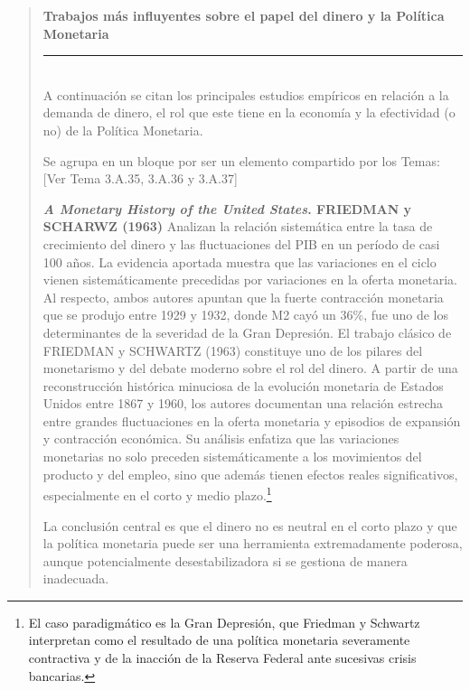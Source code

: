 \documentclass[10pt,a4paper]{article}
\newenvironment{specialblock}[1]{%
      \begin{quote} %
      \small %
      \noindent\textbf{#1}\\[-0.3em] %
      \rule{\linewidth}{0.4pt}\\[0.6em]}{
      \end{quote}}
\newcommand{\authorfont}[1]{{\fontfamily{EBGaramond-TLF}\selectfont #1}}
\begin{document}
\begin{specialblock}{Trabajos más influyentes sobre el papel del dinero y la Política Monetaria}
    A continuación se citan los principales estudios empíricos en relación a la demanda de dinero, el rol que este tiene en la economía y la efectividad (o no) de la Política Monetaria. 

    Se agrupa en un bloque por ser un elemento compartido por los Temas: [\authorfont{Ver Tema 3.A.35, 3.A.36 y 3.A.37}]

    \textbf{\textit{A Monetary History of the United States}. FRIEDMAN y SCHARWZ (1963)}
    Analizan la relación sistemática entre la tasa de crecimiento del dinero y las fluctuaciones del PIB en un período de casi 100 años. La evidencia aportada muestra que las variaciones en el ciclo vienen sistemáticamente precedidas por variaciones en la oferta monetaria. Al respecto, ambos autores apuntan que la fuerte contracción monetaria que se produjo entre 1929 y 1932, donde M2 cayó un 36\%, fue uno de los determinantes de la severidad de la Gran Depresión.
    El trabajo clásico de FRIEDMAN y SCHWARTZ (1963) constituye uno de los pilares del monetarismo y del debate moderno sobre el rol del dinero. A partir de una reconstrucción histórica minuciosa de la evolución monetaria de Estados Unidos entre 1867 y 1960, los autores documentan una relación estrecha entre grandes fluctuaciones en la oferta monetaria y episodios de expansión y contracción económica. Su análisis enfatiza que las variaciones monetarias no solo preceden sistemáticamente a los movimientos del producto y del empleo, sino que además tienen efectos reales significativos, especialmente en el corto y medio plazo.\footnote{%
        El caso paradigmático es la Gran Depresión, que Friedman y Schwartz interpretan como el resultado de una política monetaria severamente contractiva y de la inacción de la Reserva Federal ante sucesivas crisis bancarias.
    } 

    La conclusión central es que el dinero no es neutral en el corto plazo y que la política monetaria puede ser una herramienta extremadamente poderosa, aunque potencialmente desestabilizadora si se gestiona de manera inadecuada.


\end{specialblock}
\end{document}
